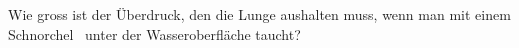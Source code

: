 Wie gross ist der Überdruck, den die Lunge aushalten muss, wenn man mit einem Schnorchel \hTO\ unter der Wasseroberfläche taucht?
